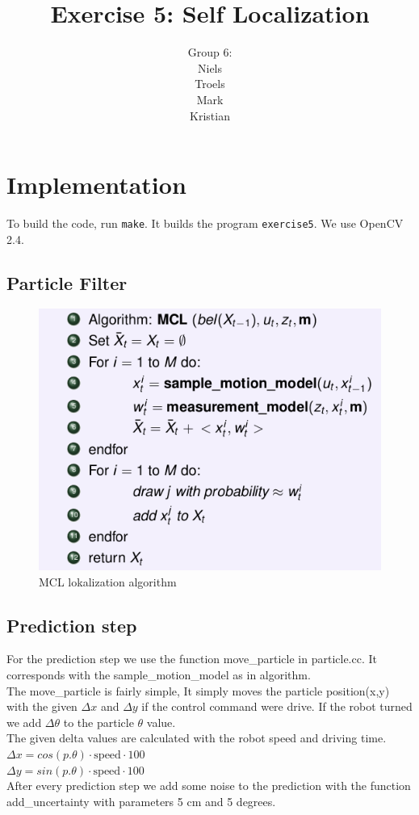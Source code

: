 \documentclass[a4paper,12pt]{article}
\title{Exercise 5: Self Localization}
\author{Group 6:\\Niels\\Troels\\Mark\\Kristian}
\begin{document}
\maketitle

\section{Implementation}

To build the code, run \texttt{make}.  It builds the program
\texttt{exercise5}.  We use OpenCV 2.4.


\subsection{Particle Filter}
\begin{figure}[htp]
\centering
\includegraphics[scale=0.50]{MCL.png}
\caption{MCL lokalization algorithm}
\label{MCL}
\end{figure}

\subsection{Prediction step}
For the prediction step we use the function move\_particle in particle.cc. It corresponds with the sample\_motion\_model as in algorithm. \\
The move\_particle is fairly simple, It simply moves the particle position(x,y) with the given $\Delta x $ and $\Delta y$ if the control command were drive. If the robot turned we add $\Delta \theta$ to the particle $\theta$ value. \\
The given delta values are calculated with the robot speed and driving time. \\
$\Delta x = cos(p.\theta)\cdot\text{speed}\cdot 100$ \\
$\Delta y = sin(p.\theta)\cdot\text{speed}\cdot 100$ \\
After every prediction step we add some noise to the prediction with the function add\_uncertainty with parameters 5 cm and 5 degrees. 
\end{document}
